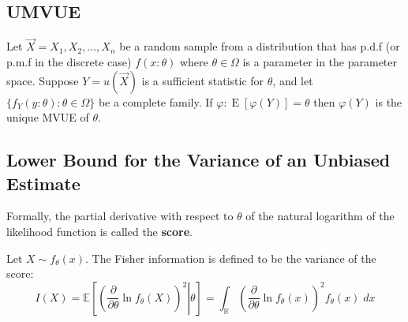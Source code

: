 \documentclass{tufte-handout}
\begin{document}
  \subsection{UMVUE}%
    \label{sub:UMVUE}
  \begin{theorem} \label{label} 
Let $\vec{X}= X_1, X_2, \dots, X_n$ be a random sample from a distribution that has p.d.f (or p.m.f in the discrete case) $f(x:\theta)$ where $\theta \in \Omega$ is a parameter in the parameter space. Suppose $Y = u(\vec{X})$ is a sufficient statistic for $\theta$, and let $\{ f_Y(y:\theta): \theta \in \Omega\}$ be a complete family. If $\varphi:\operatorname{E}[\varphi(Y)] = \theta$ then $\varphi(Y)$ is the unique MVUE of $\theta$.

  \end{theorem}
  \subsection{Lower Bound for the Variance of an Unbiased Estimate}
  \label{sub:Lower Bound for the Variance of an Unbiased Estimate}
  \begin{definition}[Score]
    Formally, the partial derivative with respect to $\theta $ of the natural logarithm of the likelihood function is called the \textbf{score}. 
    
  \end{definition}
  \begin{definition}
    Let $X \sim f_\theta(x)$. The Fisher information is defined to be the variance of the score:
    $$I(X) = \mathbb{E} \left[\left. \left(\frac{\partial }{\partial {\theta}}{\ln f_\theta(X)} \right)^2 \right|  \theta \right] =\int_{\mathbb{R}} \left(\frac{\partial }{\partial {\theta}} {\ln f_\theta(x)}\right)^2 f_\theta(x) \; dx   $$
    
  \end{definition}
\end{document}
